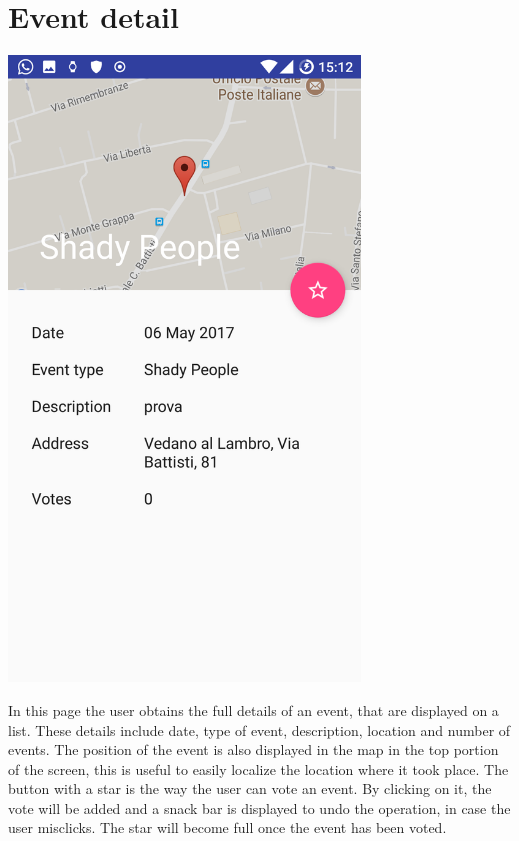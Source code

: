 \documentclass[a4paper]{scrreprt}
\begin{document}
\section{Event detail}
\begin{minipage}{0.5\textwidth}
	\centering
	\includegraphics[width=0.7\textwidth]{imgs/event_detail}
\end{minipage}
\begin{minipage}{0.5\textwidth}
	In this page the user obtains the full details of an event, that are displayed on a list. These details include date, type of event, description, location and number of events. The position of the event is also displayed in the map in the top portion of the screen, this is useful to easily localize the location where it took place. The button with a star is the way the user can vote an event. By clicking on it, the vote will be added and a snack bar is displayed to undo the operation, in case the user misclicks. The star will become full once the event has been voted.
\end{minipage}
\end{document}
